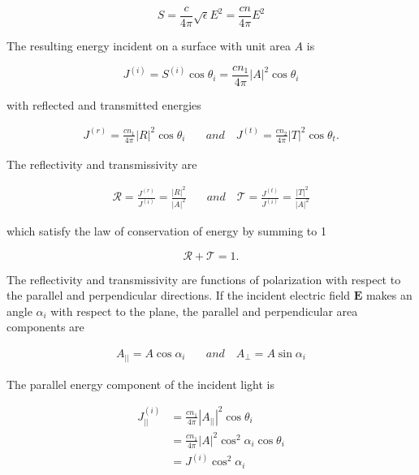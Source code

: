 \begin{equation}
    S = \frac{c}{4\pi} \sqrt{\epsilon} E^2 = \frac{cn}{4\pi} E^2
\end{equation}

The resulting energy incident on a surface with unit area $A$ is

\begin{equation}
    J^{(i)} = S^{(i)} \cos{\theta_i} = \frac{cn_1}{4\pi} |A|^2 \cos{\theta_i}
\end{equation}

with reflected and transmitted energies

\begin{align}
    J^{(r)} = \frac{cn_1}{4\pi} |R|^2 \cos{\theta_i} & \quad and \quad J^{(t)} = \frac{cn_2}{4\pi} |T|^2 \cos{\theta_t}.
\end{align}

The reflectivity and transmissivity are

\begin{align}
    \mathcal{R} = \frac{J^{(r)}}{J^{(i)}} = \frac{|R|^2}{|A|^2} & \quad and \quad \mathcal{T} = \frac{J^{(t)}}{J^{(i)}} = \frac{|T|^2}{|A|^2}
\end{align}

which satisfy the law of conservation of energy by summing to 1

\begin{equation}
    \mathcal{R} + \mathcal{T} = 1.
\end{equation}

The reflectivity and transmissivity are functions of polarization with respect to the parallel and perpendicular directions. If the incident electric field $\mathbf{E}$ makes an angle $\alpha_i$ with respect to the plane, the parallel and perpendicular area components are

\begin{align}
    A_{||} = A \cos{\alpha_i} & \quad and \quad A_{\perp} = A \sin{\alpha_i}
\end{align}

The parallel energy component of the incident light is

\begin{align}
    J_{||}^{(i)} &= \frac{cn_1}{4\pi} |A_{||}|^2 \cos{\theta_i} \nonumber \\
    &= \frac{cn_1}{4\pi} |A |^2 \cos^2{\alpha_i} \cos{\theta_i} \nonumber \\
    &= J^{(i)} \cos^2{\alpha_i}
\end{align}

